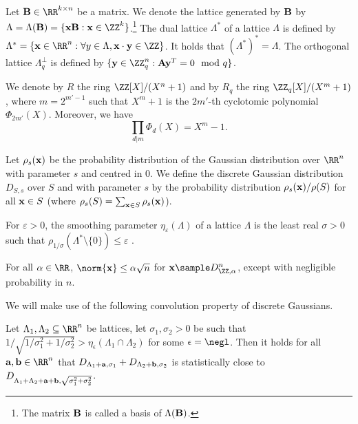 Let $\Bn\in\RR^{k\times n}$ be a matrix. We denote the lattice generated by $\mathbf{B}$ by  $\Lambda=\Lambda(\Bn)=\{\xn\Bn: \xn\in\ZZ^k\}$.\footnote{The matrix $\mathbf{B}$ is called a basis of $\Lambda(\mathbf{B})$.} The dual lattice $\Lambda^*$ of a lattice $\Lambda$ is defined by $\Lambda^*=\{\xn\in\RR^n:\forall y\in\Lambda, \xn\cdot \yn\in\ZZ\}$. It holds that $(\Lambda^*)^*=\Lambda$.  The orthogonal lattice $\Lambda_q^\perp$ is defined by $\{\yn\in\ZZ_q^n:\An\yn^T=0\mod q\}$.


\begin{definition}\label{def:cyclo}
We denote by $R$ the ring $\ZZ[X]/(X^n +1)$ and by $R_q$ the ring $\ZZ_q [X]/(X^m+1)$, where $m = 2^{m'-1}$ such that $X^m + 1$ is the $2m'$-th cyclotomic polynomial $\Phi_{2m'}(X)$. Moreover, we have
$$
\prod_{d|m} \Phi_d(X) = X^m-1.
$$
\end{definition}


Let $\rho_s(\mathbf{x})$ be the probability distribution of the Gaussian distribution over $\RR^n$ with parameter $s$ and centred in $0$. 
 We define the discrete Gaussian distribution $D_{S,s}$ over $S$ and with parameter $s$ by the probability distribution $\rho_s(\mathbf{x})/\rho(S)$ for all $\mathbf{x}\in S$ (where $\rho_s(S)=\sum_{\mathbf{x}\in S}\rho_s(\mathbf{x})$). 

For $\varepsilon>0$, the smoothing parameter $\eta_\varepsilon(\Lambda)$ of a lattice $\Lambda$ is the least real $\sigma>0$ such that $\rho_{1/\sigma}(\Lambda^*\setminus \{0\})\leq \varepsilon$ \cite{FOCS:MicReg04}.


\begin{lemma}
\label{lemma:normDG}
For all $\alpha\in \RR$, $\norm{\xn}\leq \alpha\sqrt{n}$ for $\xn\sample D_{\ZZ,\alpha}^n$, except with negligible probability in $n$.
\end{lemma}


We will make use of the following convolution property of discrete Gaussians.

\begin{lemma}\label{lem:gaussconv}
Let $\Lambda_1,\Lambda_2 \subseteq \RR^n$ be lattices, let $\sigma_1,\sigma_2 > 0$ be such that $1/\sqrt{1/\sigma_1^2 + 1/\sigma_2^2} > \eta_\epsilon(\Lambda_1 \cap \Lambda_2)$ for some $\epsilon = \negl$. Then it holds for all $\vc{a},\vc{b} \in \RR^n$ that $D_{\Lambda_1 + \mathbf{a},\sigma_1} + D_{\Lambda_2 + \mathbf{b},\sigma_2}$ is statistically close to $D_{\Lambda_1 + \Lambda_2 + \mathbf{a} + \mathbf{b},\sqrt{\sigma_1^2 + \sigma_2^2}}$.
\end{lemma}

